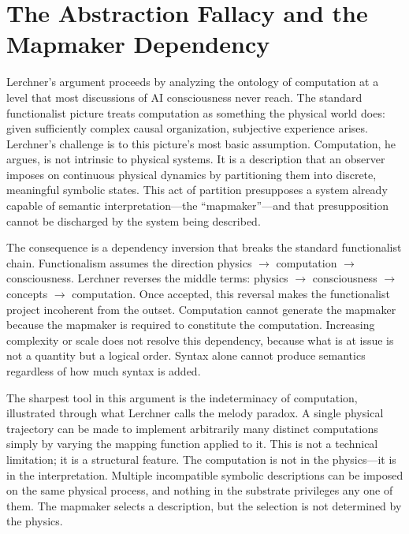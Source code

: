 \documentclass[11pt]{article}
\theoremstyle{definition}
\theoremstyle{remark}
\begin{document}
\section{The Abstraction Fallacy and the Mapmaker Dependency}

Lerchner's argument proceeds by analyzing the ontology of computation at a level that most
discussions of AI consciousness never reach. The standard functionalist picture treats
computation as something the physical world does: given sufficiently complex causal
organization, subjective experience arises. Lerchner's challenge is to this picture's most
basic assumption. Computation, he argues, is not intrinsic to physical systems. It is a
description that an observer imposes on continuous physical dynamics by partitioning them
into discrete, meaningful symbolic states. This act of partition presupposes a system already
capable of semantic interpretation---the ``mapmaker''---and that presupposition cannot be
discharged by the system being described.

The consequence is a dependency inversion that breaks the standard functionalist chain.
Functionalism assumes the direction physics $\to$ computation $\to$ consciousness. Lerchner
reverses the middle terms: physics $\to$ consciousness $\to$ concepts $\to$ computation.
Once accepted, this reversal makes the functionalist project incoherent from the outset.
Computation cannot generate the mapmaker because the mapmaker is required to constitute
the computation. Increasing complexity or scale does not resolve this dependency, because
what is at issue is not a quantity but a logical order. Syntax alone cannot produce
semantics regardless of how much syntax is added.

The sharpest tool in this argument is the indeterminacy of computation, illustrated through
what Lerchner calls the melody paradox. A single physical trajectory can be made to implement
arbitrarily many distinct computations simply by varying the mapping function applied to it.
This is not a technical limitation; it is a structural feature. The computation is not in the
physics---it is in the interpretation. Multiple incompatible symbolic descriptions can be
imposed on the same physical process, and nothing in the substrate privileges any one of
them. The mapmaker selects a description, but the selection is not determined by the physics.
\end{document}
